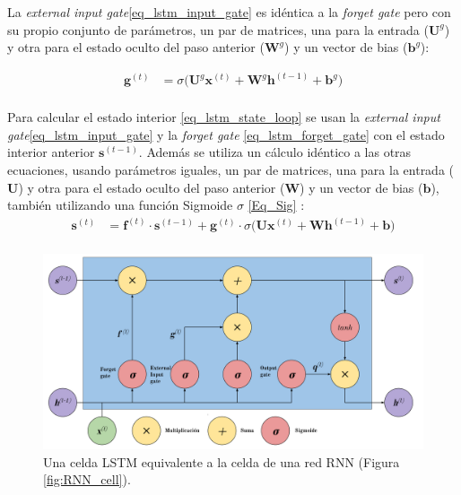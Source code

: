 \documentclass[spanish]{article}
\theoremstyle{definition}
\theoremstyle{remark}
\numberwithin{equation}{section}
\numberwithin{equation}{section} %
\begin{document}
 \par 
La \textit{external input gate}\eqref{eq_lstm_input_gate} es idéntica a la \textit{forget gate} pero con su propio conjunto de parámetros, un par de matrices, una para la entrada ($\boldsymbol{U}^g$) y otra para el estado oculto del paso anterior ($\boldsymbol{W}^g$) y un vector de bias ($\boldsymbol{b}^g$): \par
\begin{equation} 
\label{eq_lstm_input_gate}
\begin{split}
 \boldsymbol{g}^{(t)} &
 = \sigma  \Big( \boldsymbol{U}^g \boldsymbol{x}^{(t)} +  \boldsymbol{W}^g \boldsymbol{h}^{(t-1)}+\boldsymbol{b}^g\Big)\\ 
 \end{split}
 \end{equation} \par
 Para calcular el estado interior \eqref{eq_lstm_state_loop} se usan la \textit{external input gate}\eqref{eq_lstm_input_gate} y la \textit{forget gate} \eqref{eq_lstm_forget_gate} con el estado interior anterior $\boldsymbol{s}^{(t-1)}$. Además se utiliza un cálculo idéntico a las otras ecuaciones, usando parámetros iguales, un par de matrices, una para la entrada ($\boldsymbol{U}$) y otra para el estado oculto del paso anterior ($\boldsymbol{W}$) y un vector de bias ($\boldsymbol{b}$), también utilizando una función Sigmoide $\sigma$ \eqref{Eq_Sig} :
\begin{equation}
\label{eq_lstm_state_loop}
\begin{split}
 \boldsymbol{s}^{(t)} & =\boldsymbol{f}^{(t)} \cdot \boldsymbol{s}^{(t-1)}+\boldsymbol{g}^{(t)} \cdot \sigma  \Big( \boldsymbol{U} \boldsymbol{x}^{(t)} +  \boldsymbol{W} \boldsymbol{h}^{(t-1)}+\boldsymbol{b}\Big)\\ 
\end{split}
\end{equation} \par
\begin{figure}[H]
\centering
 \includegraphics[width=15cm]{img/LSTM_Cell_Schema_V2.png}
\caption[Diagrama de una celda LSTM]{\footnotesize{ Una celda LSTM \cite{hochreiter1997long,goodfellow2016deep} equivalente a la celda de una red RNN (Figura \ref{fig:RNN_cell}). }}
\label{fig:LSTM_Cell_Schema}
\end{figure}
\end{document}
